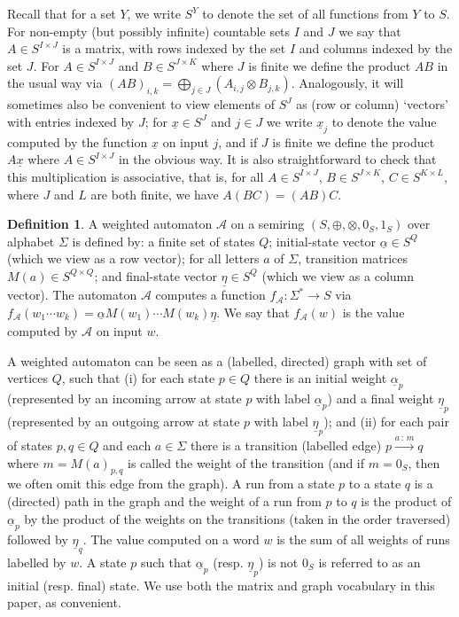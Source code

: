 \documentclass[10pt,a4paper]{amsart}
\theoremstyle{definition}
\newtheorem{defi}[thm]{Definition}
\numberwithin{equation}{section}
\numberwithin{theorem}{section}
\begin{document}
Recall that for a set $Y$, we write $S^Y$ to denote the set of all functions from $Y$ to $S$. For non-empty (but possibly infinite) countable sets $I$ and $J$ we say that $A \in S^{I \times J}$ is a matrix, with rows indexed by the set $I$ and columns indexed by the set $J$. For $A \in S^{I \times J}$ and $B \in S^{J \times K}$ where $J$ is finite we define the product $AB$ in the usual way via $(AB)_{i,k} = \bigoplus_{j \in J}(A_{i,j}\otimes B_{j,k})$.  Analogously, it will sometimes also be convenient to view elements of $S^J$ as (row or column) `vectors' with entries indexed by $J$; for $\underline{x} \in S^J$ and $j \in J$ we write  $\underline{x}_j$ to denote the value computed by the function $\underline{x}$ on input $j$, and if $J$ is finite we define the product $A\underline{x}$ where $A \in S^{I \times J}$ in the obvious way. It is also straightforward to check that this multiplication is associative, that is, for all $A \in S^{I \times J}$, $B \in S^{J \times K}$, $C \in S^{K \times L}$, where $J$ and $L$ are both finite, we have $A(BC) = (AB)C$.

\begin{defi}
A weighted automaton $\mathcal{A}$ on a semiring $(S,\oplus,\otimes,0_S,1_S)$ over alphabet $\Sigma$ is defined by: a finite set of states $Q$; initial-state vector $\underline{\alpha} \in S^{Q}$ (which we view as a row vector); for all letters $a$ of $\Sigma$, transition matrices $M(a) \in S^{Q \times Q}$; and final-state vector $\underline{\eta} \in S^{Q}$ (which we view as a column vector). The automaton $\mathcal{A}$ computes a function $f_\mathcal{A} : \Sigma^* \rightarrow S$ via $f_\mathcal{A}(w_1 \cdots w_k) = \underline{\alpha} M(w_1)\cdots M(w_k)\underline{\eta}$. We say that $f_\mathcal{A} (w)$ is the value computed by $\mathcal{A}$ on input $w$. 
\end{defi}

A weighted automaton can be seen as a (labelled, directed) graph with set of vertices $Q$, such that (i) for each state $p \in Q$ there is an initial weight $\underline{\alpha}_p$ (represented by an incoming arrow at state $p$ with label $\underline{\alpha}_p$) and a final weight $\underline{\eta}_p$ (represented by an outgoing arrow at state $p$ with label $\underline{\eta}_p$); and (ii) for each pair of states $p,q \in Q$ and each $a \in \Sigma$ there is a transition (labelled edge) $p \xrightarrow{a\, : \, m} q$ where $m=M(a)_{p,q}$ is called the weight of the transition (and if $m=0_S$, then we often omit this edge from the graph). A run from a state $p$ to a state $q$ is a (directed) path in the graph and the weight of a run from $p$ to $q$ is the product of $\underline{\alpha}_p$  by the product of the weights on the transitions (taken in the order traversed) followed by $\underline{\eta}_q$. The value computed on a word $w$ is the sum of all weights of runs labelled by $w$. A state $p$ such that $\underline{\alpha}_p$ (resp. $\underline{\eta}_p$) is not $0_S$ is referred to as an initial (resp. final) state. We use both the matrix and graph vocabulary in this paper, as convenient.
\end{document}
